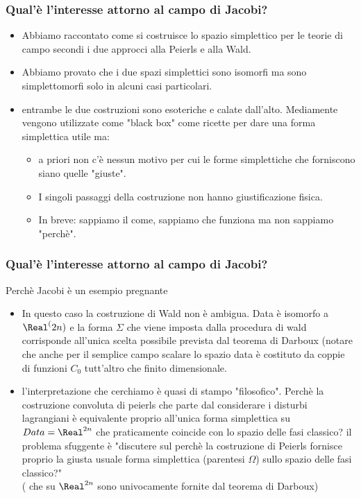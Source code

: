 \documentclass{beamer}
\begin{document}
	\begin{frame}
		\frametitle{ Qual'è l'interesse attorno al campo di Jacobi?}
					\begin{itemize}
				\item Abbiamo raccontato come si costruisce lo spazio simplettico per le teorie di campo secondi i due approcci alla Peierls e alla Wald.
				\item  Abbiamo provato che i due spazi simplettici sono isomorfi ma sono simplettomorfi solo in alcuni casi particolari.
				\item entrambe le due costruzioni sono esoteriche e calate dall'alto. 
					Mediamente vengono utilizzate come "black box" come ricette per dare una forma simplettica utile ma:
						\begin{itemize}
							\item a priori non c'è nessun motivo per cui le forme simplettiche che forniscono siano quelle "giuste".
							\item I singoli passaggi della costruzione non hanno giustificazione fisica.
							\item 	In breve: sappiamo il come, sappiamo che funziona ma non sappiamo "perchè".
						\end{itemize}
		\end{itemize}
	\end{frame}

	\begin{frame}
		\frametitle{ Qual'è l'interesse attorno al campo di Jacobi?}
					 Perchè Jacobi è un esempio pregnante
		\begin{itemize}
				\item
					In questo caso la costruzione di Wald non è ambigua. Data è isomorfo a $\Real^(2n)$ e la forma $\Sigma$ che viene imposta dalla procedura di wald corrisponde all'unica scelta possibile prevista dal teorema di Darboux (notare che anche per il semplice campo scalare lo spazio data è costituto da coppie di funzioni $C_0$ tutt'altro che finito dimensionale.
				\item l'interpretazione che cerchiamo è quasi di stampo "filosofico". Perchè la costruzione convoluta di peierls che parte dal considerare i disturbi lagrangiani è equivalente proprio all'unica forma simplettica su $Data=\Real^{2n}$ che praticamente coincide con lo spazio delle fasi classico?
				il problema sfuggente è "discutere sul perchè la costruzione di Peierls fornisce proprio la giusta usuale forma simplettica (parentesi $\Omega$) sullo spazio delle fasi classico?"\\
					( che su $\Real^{2n} $ sono univocamente fornite dal teorema di Darboux)			
		\end{itemize}
	\end{frame}
\end{document}
